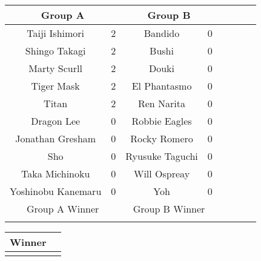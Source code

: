 \documentclass[landscape]{article}
\newcommand{\RN}[1]{%
  \textup{\uppercase\expandafter{\romannumeral#1}}%
}
\begin{document}
\vspace{10pt}
\begin{tabular}{|c|c|c|c|c|c|c|c|}
  \hline
  \multicolumn{2}{|c|}{\cellcolor{Thistle} Group A} & \multicolumn{2}{|c|}{\cellcolor{Aquamarine} Group B} \\
  \hline
  Taiji Ishimori & 2 & Bandido & 0 \\
  \hline
  Shingo Takagi & 2 & Bushi & 0 \\
  \hline
  Marty Scurll & 2 & Douki & 0 \\
  \hline
  Tiger Mask \RN{4} & 2 & El Phantasmo & 0 \\
  \hline
  Titan & 2 & Ren Narita & 0 \\
  \hline
  Dragon Lee & 0 & Robbie Eagles & 0 \\
  \hline
  Jonathan Gresham & 0 & Rocky Romero & 0 \\
  \hline
  Sho & 0 & Ryusuke Taguchi & 0 \\ 
  \hline
  Taka Michinoku & 0 & Will Ospreay & 0 \\
  \hline
  Yoshinobu Kanemaru & 0 & Yoh & 0 \\
  \hline\hline
  \multicolumn{2}{|c|}{\cellcolor{magenta} Group A Winner} & \multicolumn{2}{|c|}{\cellcolor{cyan} Group B Winner} \\
  \hline
  \multicolumn{2}{|c|}{} & \multicolumn{2}{|c|}{} \\
  \hline
\end{tabular}

\vspace{10pt}
\begin{tabular}{|c|c|}
  \hline
  \cellcolor{orange} Winner \\
  \hline
  \\
  \hline
\end{tabular}
\end{document}
